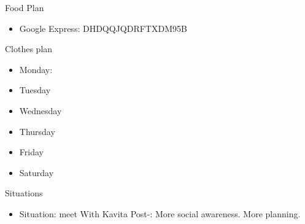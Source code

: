 \begin{columns}
    
    \begin{column}{0.25\linewidth}
      \begin{block}{Food Plan} 
        \begin{itemize}
          \tiny \item \tiny Google Express: DHDQQJQDRFTXDM95B
        \end{itemize}
      \end{block} 
      \begin{block}{Clothes plan} 
        \begin{itemize}
          \tiny \item \tiny Monday: 
        \item \tiny Tuesday
        \item \tiny Wednesday
        \item \tiny Thursday
        \item \tiny Friday
        \item \tiny Saturday
        \end{itemize} 
      \end{block} 
      
      \begin{block}{Situations}
        \begin{itemize}
          \tiny \item \tiny Situation: meet With Kavita  Post-: More
          social awareness. More planning.
        \end{itemize}
      \end{block}

    \end{column} 
  \end{columns}
